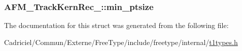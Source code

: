 \hypertarget{struct_a_f_m___track_kern_rec___a7b1e7fd74d92dcf2b89fee7f74d4fdba}{
\subsubsection[{min\-\_\-ptsize}]{ A\-F\-M\-\_\-\-Track\-Kern\-Rec\-\_\-\-::min\-\_\-ptsize}}\label{struct_a_f_m___track_kern_rec___a7b1e7fd74d92dcf2b89fee7f74d4fdba}


The documentation for this struct was generated from the following file\-:\begin{DoxyCompactItemize}
\item 
Cadriciel/\-Commun/\-Externe/\-Free\-Type/include/freetype/internal/\hyperlink{t1types_8h}{t1types.\-h}\end{DoxyCompactItemize}
